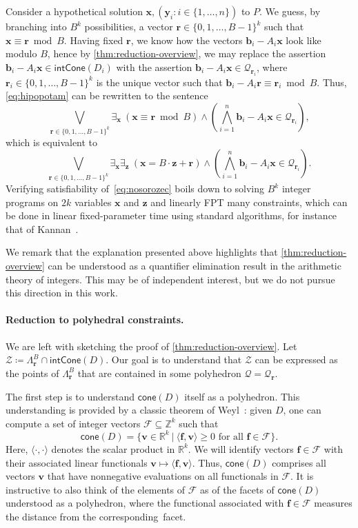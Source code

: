 \documentclass{theoretics}
\renewcommand{\geq}{\geqslant}
\newcommand{\Z}{\mathbb{Z}}
\newcommand{\R}{\mathbb{R}}
\newcommand{\tup}[1]{{\mathbf{#1}}}
\newcommand{\xx}{\tup x}
\newcommand{\yy}{\tup y}
\newcommand{\zz}{\tup z}
\newcommand{\bb}{\tup b}
\newcommand{\ff}{\tup f}
\newcommand{\rr}{\tup r}
\newcommand{\myvv}{\tup v} %
\newcommand{\Qq}{\mathcal{Q}}
\newcommand{\Ff}{\mathcal{F}}
\newcommand{\Zz}{\mathcal{Z}}
\newcommand{\sca}[2]{\langle #1,#2\rangle}
\newcommand{\realcone}{\mathsf{cone}}
\newcommand{\intcone}{\mathsf{intCone}}
\begin{document}
Consider a hypothetical solution $\xx,(\yy_i\colon i\in \{1,\ldots,n\})$ to $P$.
We guess, by branching into $B^k$ possibilities, a vector $\rr\in \{0,1,\ldots,B-1\}^k$ such that $\xx\equiv \rr\bmod B$. Having fixed $\rr$, we know how the vectors $\bb_i-A_i\xx$ look like modulo $B$, hence by \cref{thm:reduction-overview}, we may replace the assertion $\bb_i-A_i\xx\in \intcone(D_i)$ with the assertion $\bb_i-A_i\xx \in \Qq_{\rr_i}$, where $\rr_i\in \{0,1,\ldots,B-1\}^k$ is the unique vector such that $\bb_i-A_i\rr\equiv \rr_i\bmod B$. Thus, \eqref{eq:hipopotam} can be rewritten to the sentence
\begin{equation*}
    \bigvee_{\rr\in \{0,1,\ldots,B-1\}^k}
    \exists_{\xx}\ \left(\xx\equiv \rr\bmod B\right) \wedge  \left(\bigwedge_{i=1}^n \bb_i-A_i\xx\in \Qq_{\rr_i}\right),
\end{equation*}
which is equivalent to
\begin{equation}\label{eq:nosorozec}
    \bigvee_{\rr\in \{0,1,\ldots,B-1\}^k}
    \exists_{\xx}\exists_{\zz}\ \left(\xx=B\cdot \zz+\rr\right) \wedge  \left(\bigwedge_{i=1}^n \bb_i-A_i\xx\in \Qq_{\rr_i}\right).
\end{equation}
Verifying satisfiability of~\eqref{eq:nosorozec} boils down to solving $B^k$ integer programs on $2k$ variables $\xx$ and $\zz$ and linearly FPT many constraints, which can be done in linear fixed-parameter time using standard algorithms, for instance that of Kannan~\cite{kannan1987minkowski}.

We remark that the explanation presented above highlights that \cref{thm:reduction-overview} can be understood as a quantifier elimination result in the arithmetic theory of integers. This may be of independent interest, but we do not pursue this direction in this work.

\paragraph*{Reduction to polyhedral constraints.} We are left with sketching the proof of \cref{thm:reduction-overview}. Let $\Zz\coloneqq \Lambda_\rr^B\cap \intcone(D)$. Our goal is to understand that $\Zz$ can be expressed as the points of $\Lambda_\rr^B$ that are contained in some polyhedron $\Qq=\Qq_\rr$.

The first step is to understand $\realcone(D)$ itself as a polyhedron. This understanding is provided by a classic theorem of Weyl~\cite{Weyl35}: given $D$, one can compute a set of integer vectors $\Ff\subseteq \Z^k$ such that
$$\realcone(D)=\{\myvv\in \R^k~|~\sca{\ff}{\myvv}\geq 0\textrm{ for all }\ff\in \Ff\}.$$
Here, $\sca{\cdot}{\cdot}$ denotes the scalar product in $\R^k$. We will identify vectors $\ff\in \Ff$ with their associated linear functionals $\myvv\mapsto \sca{\ff}{\myvv}$. Thus, $\realcone(D)$ comprises all vectors $\myvv$ that have nonnegative evaluations on all functionals in $\Ff$. It is instructive to also think of the elements of $\Ff$ as of the facets of $\realcone(D)$ understood as a polyhedron, where the functional associated with $\ff\in \Ff$ measures the distance from the corresponding~facet.
\end{document}
